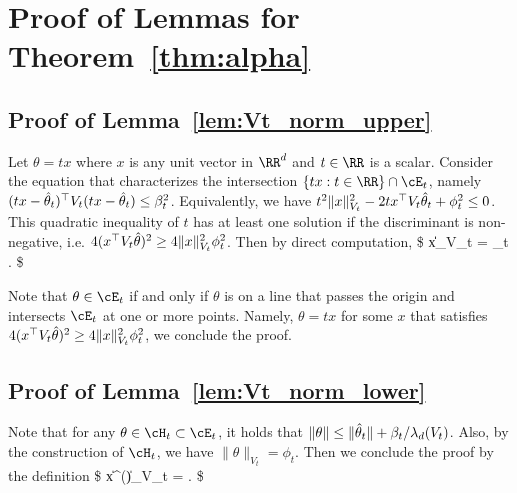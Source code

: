 






\section{Proof of Lemmas for Theorem~\ref{thm:alpha}}
\label{sec:proof_alpha}
\subsection{Proof of Lemma~\ref{lem:Vt_norm_upper}}


	Let $\theta = t x $ where $x$ is any unit vector in $\RR^d$ and $t\in \RR $ is a scalar. Consider the equation that characterizes the intersection  $\{t x : t\in\RR \}\cap \cE_t $, namely
	$
	(t x - \hat{\theta}_t)^\top V_t (t x - \hat{\theta}_t) \leq  \beta_t^2
	$.
	Equivalently, we have
	$
	t^2\|x\|_{V_t}^2 - 2 t  x^\top V_t \hat{\theta}_t + \phi_t^2 \leq 0
	$. This quadratic inequality of $t$ has at least one solution if the discriminant is non-negative, i.e.
	$
	4(x^\top V_t \hat{\theta})^2 \geq 4 \|x\|_{V_t}^2 \phi_t^2 
	$.
	Then by direct computation,
	\$
	\|x\|_{V_t} \leq {} \leq {} =   {\phi_t	}.
	\$

	Note that $\theta \in \cE_t$ if and only if $\theta$ is on a line that passes the origin and intersects $\cE_t$ at one or more points. Namely, 
	$\theta = t x $ for some $x$ that satisfies $4(x^\top V_t \hat{\theta})^2 \geq 4 \|x\|_{V_t}^2 \phi_t^2$, we conclude the proof.
	

	
\Halmos 
\endproof
\subsection{Proof of Lemma~\ref{lem:Vt_norm_lower}}
	Note that for any $\theta \in \cH_t \subset\cE_t$, it holds that  $\|\theta\| \leq \|\hat{\theta}_t\| +  \beta_t/\lambda_d(V_t)  $. Also, by the construction of $\cH_t$, we have $\|\theta\|_{V_t}  =  \phi_t$. Then we conclude the proof by the definition
	\$
	\|x^\star(\theta )\|_{V_t} =  \geq {} .
	\$
\Halmos 
\endproof


